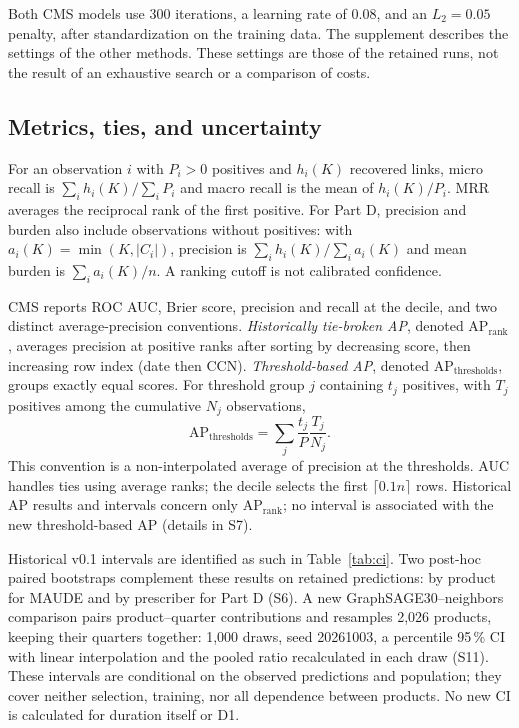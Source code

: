 Both CMS models use 300 iterations, a learning rate of 0.08, and an $L_2=0.05$ penalty, after standardization on the training data. The supplement describes the settings of the other methods. These settings are those of the retained runs, not the result of an exhaustive search or a comparison of costs.

\subsection{Metrics, ties, and uncertainty}
\label{sec:metrics}

For an observation $i$ with $P_i>0$ positives and $h_i(K)$ recovered links, micro recall is $\sum_i h_i(K)/\sum_i P_i$ and macro recall is the mean of $h_i(K)/P_i$. MRR averages the reciprocal rank of the first positive. For Part D, precision and burden also include observations without positives: with $a_i(K)=\min(K,|C_i|)$, precision is $\sum_i h_i(K)/\sum_i a_i(K)$ and mean burden is $\sum_i a_i(K)/n$. A ranking cutoff is not calibrated confidence.

CMS reports ROC AUC, Brier score, precision and recall at the decile, and two distinct average-precision conventions. \emph{Historically tie-broken AP}, denoted $\mathrm{AP}_{\mathrm{rank}}$, averages precision at positive ranks after sorting by decreasing score, then increasing row index (date then CCN). \emph{Threshold-based AP}, denoted $\mathrm{AP}_{\mathrm{thresholds}}$, groups exactly equal scores. For threshold group $j$ containing $t_j$ positives, with $T_j$ positives among the cumulative $N_j$ observations,
\begin{equation}
 \mathrm{AP}_{\mathrm{thresholds}}=\sum_j\frac{t_j}{P}\frac{T_j}{N_j}.
\end{equation}
This convention is a non-interpolated average of precision at the thresholds\cite{sklearnap}. AUC handles ties using average ranks; the decile selects the first $\lceil0.1n\rceil$ rows. Historical AP results and intervals concern only $\mathrm{AP}_{\mathrm{rank}}$; no interval is associated with the new threshold-based AP (details in S7).

Historical v0.1 intervals are identified as such in Table~\ref{tab:ci}. Two post-hoc paired bootstraps complement these results on retained predictions: by product for MAUDE and by prescriber for Part D (S6). A new GraphSAGE30--neighbors comparison pairs product--quarter contributions and resamples 2,026 products, keeping their quarters together: 1,000 draws, seed 20261003, a percentile 95\,\% CI with linear interpolation and the pooled ratio recalculated in each draw (S11). These intervals are conditional on the observed predictions and population; they cover neither selection, training, nor all dependence between products. No new CI is calculated for duration itself or D1.

